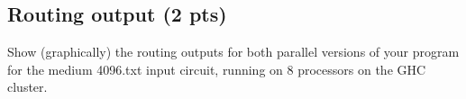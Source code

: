 \documentclass[letterpaper,11pt]{exam}
\begin{document}
\begin{questions}




    \question
    \subsection*{Routing output (2 pts)}
    Show (graphically) the routing outputs for both parallel versions of your
    program for the medium 4096.txt input circuit, running on 8 processors on the GHC cluster.
    \vspace{-0.2cm}


\end{questions}
\end{document}
